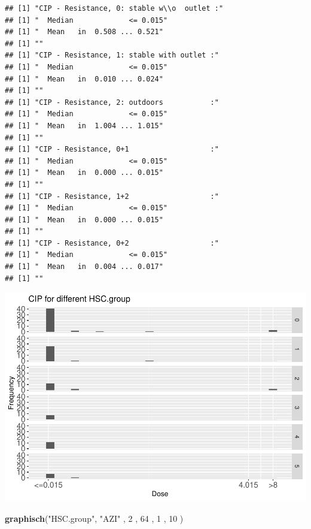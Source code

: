 \documentclass[
]{article}
\newenvironment{Shaded}{\begin{snugshade}}{\end{snugshade}}
\newcommand{\DecValTok}[1]{\textcolor[rgb]{0.00,0.00,0.81}{#1}}
\newcommand{\KeywordTok}[1]{\textcolor[rgb]{0.13,0.29,0.53}{\textbf{#1}}}
\newcommand{\NormalTok}[1]{#1}
\newcommand{\StringTok}[1]{\textcolor[rgb]{0.31,0.60,0.02}{#1}}
\begin{document}
\begin{verbatim}
## [1] "CIP - Resistance, 0: stable w\\o  outlet :"
## [1] "  Median             <= 0.015"
## [1] "  Mean   in  0.508 ... 0.521"
## [1] ""
## [1] "CIP - Resistance, 1: stable with outlet :"
## [1] "  Median             <= 0.015"
## [1] "  Mean   in  0.010 ... 0.024"
## [1] ""
## [1] "CIP - Resistance, 2: outdoors           :"
## [1] "  Median             <= 0.015"
## [1] "  Mean   in  1.004 ... 1.015"
## [1] ""
## [1] "CIP - Resistance, 0+1                   :"
## [1] "  Median             <= 0.015"
## [1] "  Mean   in  0.000 ... 0.015"
## [1] ""
## [1] "CIP - Resistance, 1+2                   :"
## [1] "  Median             <= 0.015"
## [1] "  Mean   in  0.000 ... 0.015"
## [1] ""
## [1] "CIP - Resistance, 0+2                   :"
## [1] "  Median             <= 0.015"
## [1] "  Mean   in  0.004 ... 0.017"
## [1] ""
\end{verbatim}

\includegraphics{Verteilungen_files/figure-latex/unnamed-chunk-46-1.pdf}

\begin{Shaded}
\begin{Highlighting}[]
   \KeywordTok{graphisch}\NormalTok{(}\StringTok{"HSC.group"}\NormalTok{, }\StringTok{"AZI"}\NormalTok{ , }\DecValTok{2}\NormalTok{    ,  }\DecValTok{64}\NormalTok{   ,   }\DecValTok{1}\NormalTok{    ,   }\DecValTok{10}\NormalTok{    )}
\end{Highlighting}
\end{Shaded}
\end{document}

